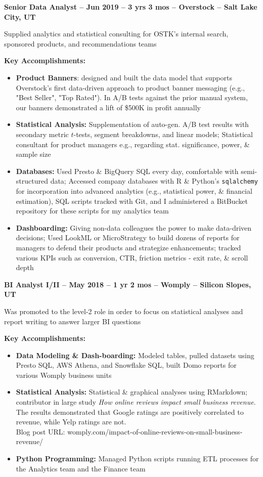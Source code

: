 \documentclass[resmargin, centered, 10pt]{res}
\def \fullwidth{\textwidth}
\newcommand{\tab}[1][1cm]{\hspace*{#1}}
\newcommand{\subtext}[1]{\tab[0.5cm] \parbox{\dimexpr\fullwidth-0.5cm\relax}{#1}}
\begin{document}
\begin{resume}
\textbf{Senior Data Analyst -- Jun 2019 -- 3 yrs 3 mos -- Overstock -- Salt Lake City, UT}

\subtext{Supplied analytics and statistical consulting for OSTK's internal search, sponsored products, and recommendations teams}

\subtext{\textbf{Key Accomplishments:}}

\begin{itemize}
	\item \textbf{Product Banners}: designed and built the data model that supports Overstock's first data-driven approach to product banner messaging (e.g., "Best Seller", "Top Rated"). In A/B tests against the prior manual system, our banners demonstrated a lift of \$500K in profit annually
	\item \textbf{Statistical Analysis:} Supplementation of auto-gen. A/B test results with secondary metric $t$-tests, segment breakdowns, and linear models; Statistical consultant for product managers e.g., regarding stat. significance, power, \& sample size
	\item \textbf{Databases:} Used Presto \& BigQuery SQL every day, comfortable with semi-structured data; Accessed company databases with R \& Python's \texttt{sqlalchemy} for incorporation into advanced analytics (e.g., statistical power, \& financial estimation), SQL scripts tracked with Git, and I administered a BitBucket repository for these scripts for my analytics team
	\item \textbf{Dashboarding:} Giving non-data colleagues the power to make data-driven decisions; Used LookML or MicroStrategy to build dozens of reports for managers to defend their products and strategize enhancements; tracked various KPIs such as conversion, CTR, friction metrics - exit rate, \& scroll depth
\end{itemize}

\textbf{BI Analyst I/II -- May 2018 -- 1 yr 2 mos -- Womply -- Silicon Slopes, UT}

\subtext{Was promoted to the level-2 role in order to focus on statistical analyses and report writing to answer larger BI questions}

\subtext{\textbf{Key Accomplishments:}}
	
\begin{itemize}
	\item \textbf{Data Modeling \& Dash-boarding:} Modeled tables, pulled datasets using Presto SQL, AWS Athena, and Snowflake SQL, built Domo reports for various Womply business units
	\item \textbf{Statistical Analysis:} Statistical  \& graphical analyses using RMarkdown; contributor in large study \textit{How online reviews impact small business revenue}. The results demonstrated that Google ratings are positively correlated to revenue, while Yelp ratings are not. \\
	Blog post URL: womply.com/impact-of-online-reviews-on-small-business-revenue/
	\item \textbf{Python Programming:} Managed Python scripts running ETL processes for the Analytics team and the Finance team
\end{itemize}


\end{resume}
\end{document}
